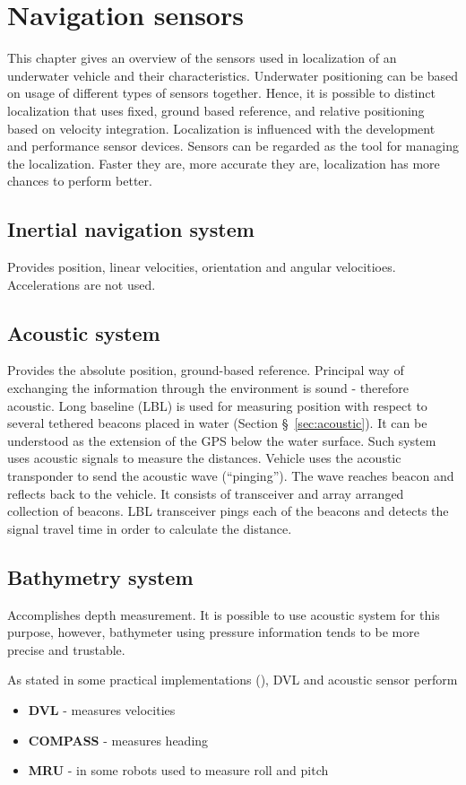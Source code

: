 \chapter{Navigation sensors} \label{chap:sensors}

This chapter gives an overview of the sensors used in localization of an underwater vehicle and their characteristics.  Underwater positioning can be based on usage of different types of sensors together. Hence, it is possible to distinct localization that uses fixed, ground based reference, and relative positioning based on velocity integration. Localization is influenced with the development and performance sensor devices. Sensors can be regarded as the tool for managing the localization. Faster they are, more accurate they are, localization has more chances to perform better.

\section{Inertial navigation system}
Provides position, linear velocities, orientation and angular velocitioes. Accelerations are not used. 

\section{Acoustic system}
Provides the absolute position, ground-based reference. Principal way of exchanging the information through the environment is sound - therefore acoustic. Long baseline (LBL) is used for measuring position with respect to several tethered beacons placed in water (Section \S~\ref{sec:acoustic}). It can be understood as the extension of the GPS below the water surface. Such system uses acoustic signals to measure the distances. Vehicle uses the acoustic transponder to send the acoustic wave (``pinging''). The wave reaches beacon and reflects back to the vehicle. It consists of transceiver and array arranged collection of beacons. LBL transceiver pings each of the beacons and detects the signal travel time in order to calculate the distance. 

\section{Bathymetry system}
Accomplishes depth measurement. It is possible to use acoustic system for this purpose, however, bathymeter using pressure information tends to be more precise and trustable.

As stated in some practical implementations (\cite{blain03}), DVL and acoustic sensor perform 

\begin{itemize}
\item \textbf{DVL} - measures velocities
\item \textbf{COMPASS} - measures heading
\item \textbf{MRU} - in some robots used to measure roll and pitch
\end{itemize}